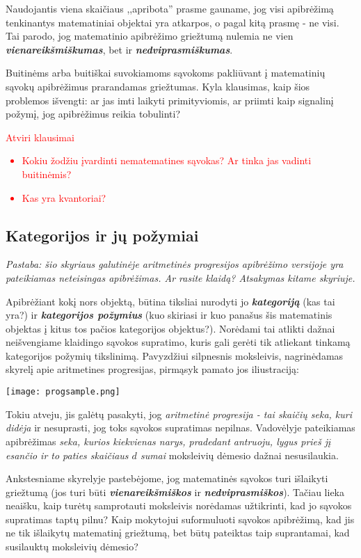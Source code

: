 \documentclass{article}
\begin{document}
Naudojantis viena skaičiaus ,,apribota'' prasme gauname, jog visi apibrėžimą tenkinantys matematiniai objektai yra atkarpos, o pagal kitą prasmę - ne visi. Tai parodo, jog matematinio apibrėžimo griežtumą nulemia ne vien \textit{\textbf{vienareikšmiškumas}}, bet ir \textit{\textbf{nedviprasmiškumas}}.

Buitinėms arba buitiškai suvokiamoms sąvokoms pakliūvant į matematinių sąvokų apibrėžimus prarandamas griežtumas. Kyla klausimas, kaip šios problemos išvengti: ar jas imti laikyti primityviomis, ar priimti kaip signalinį požymį, jog apibrėžimus reikia tobulinti? 

\textcolor{red}{
Atviri klausimai
\begin{itemize}
\item Kokiu žodžiu įvardinti nematematines sąvokas? Ar tinka jas vadinti buitinėmis?
\item Kas yra kvantoriai?
\end{itemize}}

\subsection{Kategorijos ir jų požymiai}
\textit{Pastaba: šio skyriaus galutinėje aritmetinės progresijos apibrėžimo versijoje yra pateikiamas neteisingas apibrėžimas. Ar rasite klaidą? Atsakymas kitame skyriuje.}

Apibrėžiant kokį nors objektą, būtina tiksliai nurodyti jo \textbf{\textit{kategoriją}} (kas tai yra?) ir \textbf{\textit{kategorijos požymius}} (kuo skiriasi ir kuo panašus šis matematinis objektas į kitus tos pačios kategorijos objektus?). Norėdami tai atlikti dažnai  neišvengiame klaidingo sąvokos supratimo, kuris gali gerėti tik atliekant tinkamą kategorijos požymių tikslinimą. Pavyzdžiui silpnesnis moksleivis, nagrinėdamas skyrelį apie aritmetines progresijas, pirmąsyk pamato jos iliustraciją:

\texttt{[image: progsample.png]}

Tokiu atveju, jis galėtų pasakyti, jog \textit{aritmetinė progresija - tai skaičių seka, kuri didėja} ir nesuprasti, jog toks sąvokos supratimas nepilnas. Vadovėlyje pateikiamas apibrėžimas \textit{seka, kurios kiekvienas narys, pradedant antruoju, lygus prieš jį esančio ir to paties skaičiaus $d$ sumai} moksleivių dėmesio dažnai nesusilaukia. 

Ankstesniame skyrelyje pastebėjome, jog matematinės sąvokos turi išlaikyti griežtumą (jos turi būti \textbf{\textit{vienareikšmiškos}} ir \textbf{\textit{nedviprasmiškos}}). Tačiau lieka neaišku, kaip turėtų samprotauti moksleivis norėdamas užtikrinti, kad jo sąvokos supratimas taptų pilnu? Kaip mokytojui suformuluoti sąvokos apibrėžimą, kad jis ne tik išlaikytų matematinį griežtumą, bet būtų pateiktas taip suprantamai, kad susilauktų moksleivių dėmesio? 
\end{document}
